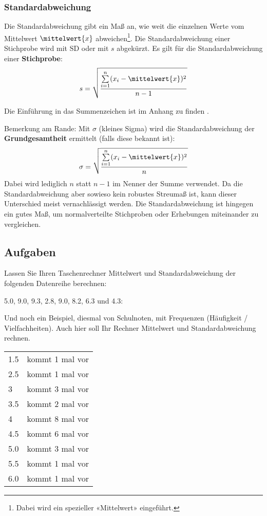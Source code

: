\subsubsection{Standardabweichung}



Die Standardabweichung gibt ein Maß an, wie weit die einzelnen Werte
vom Mittelwert $\mittelwert{x}$ abweichen\footnote{Dabei wird ein spezieller «Mittelwert»
  eingeführt.}.
Die Standardabweichung einer Stichprobe wird mit $\text{SD}$ oder
mit $s$ abgekürzt. Es gilt für die Standardabweichung einer
\textbf{Stichprobe}:
$$s = \sqrt{\frac{\sum\limits_{i=1}^n(x_i-\mittelwert{x})^2}{n-1}}$$

Die Einführung in das Summenzeichen ist im Anhang zu finden .

Bemerkung am Rande: Mit $\sigma$ (kleines Sigma) wird die
Standardabweichung der \textbf{Grundgesamtheit} ermittelt (falls diese
bekannt ist):
$$\sigma = \sqrt{\frac{\sum\limits_{i=1}^n(x_i-\mittelwert{x})^2}{n}}$$
Dabei wird lediglich $n$ statt $n-1$ im Nenner der Summe verwendet. Da
die Standardabweichung aber sowieso kein robustes Streumaß ist, kann
dieser Unterschied meist vernachlässigt werden. Die Standardabweichung ist hingegen ein gutes Maß, um normalverteilte Stichproben oder Erhebungen miteinander zu vergleichen. 

\newpage
\subsection*{Aufgaben}

Lassen Sie Ihren Taschenrechner Mittelwert und Standardabweichung der folgenden
Datenreihe berechnen:

5.0, 9.0, 9.3, 2.8, 9.0, 8.2, 6.3 und 4.3:



Und noch ein Beispiel, diesmal von Schulnoten, mit Frequenzen
(Häufigkeit / Vielfachheiten). Auch hier soll Ihr Rechner Mittelwert und
Standardabweichung rechnen.

\begin{tabular}{ll}
1.5 & kommt 1 mal vor\\
2.5 & kommt 1 mal vor\\
3   & kommt 3 mal vor\\
3.5 & kommt 2 mal vor\\
4   & kommt 8 mal vor\\
4.5 & kommt 6 mal vor\\
5.0 & kommt 3 mal vor\\
5.5 & kommt 1 mal vor\\
6.0 & kommt 1 mal vor
\end{tabular}

